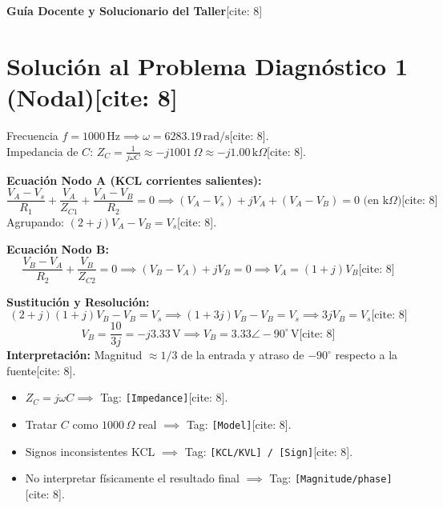 \documentclass[11pt, a4paper]{article}
\begin{document}
\begin{center}
    \Large\textbf{\textcolor{ucbblue}{Guía Docente y Solucionario del Taller}}[cite: 8]
\end{center}

\section*{Solución al Problema Diagnóstico 1 (Nodal)[cite: 8]}
Frecuencia $f = 1000\,\text{Hz} \implies \omega = 6283.19\,\text{rad/s}$[cite: 8]. \\
Impedancia de $C$: $Z_C = \frac{1}{j\omega C} \approx -j1001\,\Omega \approx -j1.00\,\text{k}\Omega$[cite: 8].

\textbf{Ecuación Nodo A (KCL corrientes salientes):}
\begin{equation*}
    \frac{V_A - V_s}{R_1} + \frac{V_A}{Z_{C1}} + \frac{V_A - V_B}{R_2} = 0 \implies (V_A - V_s) + jV_A + (V_A - V_B) = 0 \text{ (en k}\Omega\text{)} \text{[cite: 8]}
\end{equation*}
Agrupando: $(2 + j)V_A - V_B = V_s$[cite: 8].

\textbf{Ecuación Nodo B:}
\begin{equation*}
    \frac{V_B - V_A}{R_2} + \frac{V_B}{Z_{C2}} = 0 \implies (V_B - V_A) + jV_B = 0 \implies V_A = (1 + j)V_B \text{[cite: 8]}
\end{equation*}

\textbf{Sustitución y Resolución:}
\begin{equation*}
    (2 + j)(1 + j)V_B - V_B = V_s \implies (1 + 3j)V_B - V_B = V_s \implies 3jV_B = V_s \text{[cite: 8]}
\end{equation*}
\begin{equation*}
    V_B = \frac{10}{3j} = -j3.33\,\text{V} \implies \boxed{V_B = 3.33\angle-90^\circ\,\text{V}} \text{[cite: 8]}
\end{equation*}
\textbf{Interpretación:} Magnitud $\approx 1/3$ de la entrada y atraso de $-90^\circ$ respecto a la fuente[cite: 8].

\begin{tcolorbox}[colback=gray!10, title=\textbf{Checkpoints y Errores Comunes[cite: 8]}]
    \begin{itemize}
        \item $Z_C = j\omega C \implies$ Tag: \texttt{[Impedance]}[cite: 8].
        \item Tratar $C$ como $1000\,\Omega$ real $\implies$ Tag: \texttt{[Model]}[cite: 8].
        \item Signos inconsistentes KCL $\implies$ Tag: \texttt{[KCL/KVL] / [Sign]}[cite: 8].
        \item No interpretar físicamente el resultado final $\implies$ Tag: \texttt{[Magnitude/phase]}[cite: 8].
    \end{itemize}
\end{tcolorbox}
\end{document}
